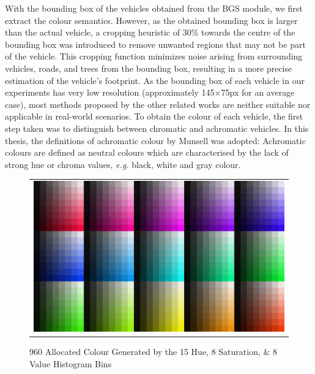 With the bounding box of the vehicles obtained from the BGS module, we first extract the colour semantics.
However, as the obtained bounding box is larger than the actual vehicle, a cropping heuristic of 30\% towards the centre of the bounding box was introduced to remove unwanted regions that may not be part of the vehicle.
This cropping function minimizes noise arising from surrounding vehicles, roads, and trees from the bounding box, resulting in a more precise estimation of the vehicle's footprint.
As the bounding box of each vehicle in our experiments has very low resolution (approximately 145$\times$75px for an average case), most methods proposed by the other related works are neither suitable nor applicable in real-world scenarios.
To obtain the colour of each vehicle, the first step taken was to distinguish between chromatic and achromatic vehicles.
In this thesis, the definitions of achromatic colour by Munsell was adopted: Achromatic colours are defined as neutral colours which are characterised by the lack of strong hue or chroma values, \emph{e.g.} black, white and gray colour.

\begin{figure}[htb!]
  \centering
\begin{tabular}{c}
 \includegraphics[width=0.7\linewidth]{image/retrievalOne/all.png} \\
\end{tabular}
    \caption{960 Allocated Colour Generated by the 15 Hue, 8 Saturation, \& 8 Value Histogram Bins} \label{fig:hsvAllocated}
\end{figure}

